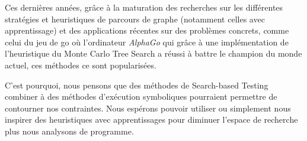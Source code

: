 Ces dernières années, grâce à la maturation des recherches sur les différentes stratégies et heuristiques de parcours de graphe (notamment celles avec apprentissage) et des applications récentes sur des problèmes concrets, comme celui du jeu de go où l'ordinateur \textit{AlphaGo}\cite{AlphaGo-research} qui grâce à une implémentation de l'heuristique du Monte Carlo Tree Search a réussi à battre le champion du monde actuel, ces méthodes ce sont popularisées.

C'est pourquoi, nous pensons que des méthodes de Search-based Testing combiner à des méthodes d'exécution symboliques pourraient permettre de contourner nos contraintes. Nous espérons pouvoir utiliser ou simplement nous inspirer des heuristiques avec apprentissages pour diminuer l'espace de recherche plus nous analysons de programme.


